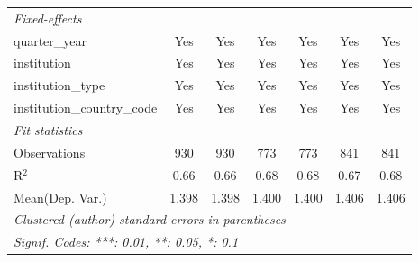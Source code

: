 \begin{tabular}{lcccccc}
   \emph{Fixed-effects}\\
   quarter\_year                      & Yes     & Yes     & Yes     & Yes     & Yes        & Yes\\  
   institution                        & Yes     & Yes     & Yes     & Yes     & Yes        & Yes\\  
   institution\_type                  & Yes     & Yes     & Yes     & Yes     & Yes        & Yes\\  
   institution\_country\_code         & Yes     & Yes     & Yes     & Yes     & Yes        & Yes\\  
   \midrule
   \emph{Fit statistics}\\
   Observations                       & 930     & 930     & 773     & 773     & 841        & 841\\  
   R$^2$                              & 0.66    & 0.66    & 0.68    & 0.68    & 0.67       & 0.68\\  
Mean(Dep. Var.) & 1.398 & 1.398 & 1.400 & 1.400 & 1.406 & 1.406 \\
   \midrule \midrule
   \multicolumn{7}{l}{\emph{Clustered (author) standard-errors in parentheses}}\\
   \multicolumn{7}{l}{\emph{Signif. Codes: ***: 0.01, **: 0.05, *: 0.1}}\\
\end{tabular}
\par\endgroup
